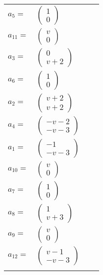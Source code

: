 \documentclass[1p]{elsarticle_modified}
\theoremstyle{definition}
\begin{document}
\begin{tabular}{m{7pt} m{180pt} m{7pt} m{180pt} }
\flushright $a_{5}=$&$\begin{pmatrix}1\\0\end{pmatrix}$ \\
\flushright $a_{11}=$&$\begin{pmatrix}v\\0\end{pmatrix}$ \\
\flushright $a_{3}=$&$\begin{pmatrix}0\\v+2\end{pmatrix}$ \\
\flushright $a_{6}=$&$\begin{pmatrix}1\\0\end{pmatrix}$ \\
\flushright $a_{2}=$&$\begin{pmatrix}v+2\\v+2\end{pmatrix}$ \\
\flushright $a_{4}=$&$\begin{pmatrix}- v-2\\- v-3\end{pmatrix}$ \\
\flushright $a_{1}=$&$\begin{pmatrix}-1\\- v-3\end{pmatrix}$ \\
\flushright $a_{10}=$&$\begin{pmatrix}v\\0\end{pmatrix}$ \\
\flushright $a_{7}=$&$\begin{pmatrix}1\\0\end{pmatrix}$ \\
\flushright $a_{8}=$&$\begin{pmatrix}1\\v+3\end{pmatrix}$ \\
\flushright $a_{9}=$&$\begin{pmatrix}v\\0\end{pmatrix}$ \\
\flushright $a_{12}=$&$\begin{pmatrix}v-1\\- v-3\end{pmatrix}$\\&\end{tabular}
\end{document}
